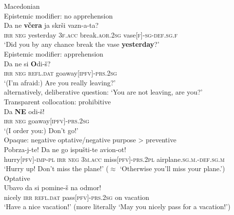 \documentclass[output=paper,colorlinks,citecolor=brown]{langscibook}
\begin{document}
\ea 
\textnormal{Macedonian} \\
\ea \label{ex:wiemer34} \textnormal{Epistemic modifier: no apprehension} \\
\gll Da ne \textbf{včera} ja skrši vazn-a-ta? \\
\textsc{irr} \textsc{neg} yesterday \textsc{3f.acc} break\textsc{.aor.2sg} vase[\textsc{f}]-\textsc{sg-def.sg.f} \\
\glt `Did you by any chance break the vase \textbf{yesterday}?' \\
\ex \label{ex:wiemer35} \textnormal{Epistemic modifier: apprehension}\\
\gll Da ne {\op}si{\cp} \textbf{O}di-š? \\
\textsc{irr} \textsc{neg} \textsc{refl.dat} go\textunderscore away\textsc{[ipfv]-prs.2sg} \\
\glt `(I'm afraid:) Are you really leaving?' \\
alternatively, deliberative question: `You are not leaving, are you?' \\
\ex \label{ex:wiemer36} \textnormal{Transparent collocation: prohibitive} \\
\gll Da \textbf{NE} odi-š! \\
\textsc{irr} \textsc{neg} go\textunderscore away\textsc{[ipfv]-prs.2sg} \\
\glt `(I order you:) Don't go!' \\
\ex \label{ex:wiemer37} \textnormal{Opaque: negative optative/negative purpose > preventive} \\
\gll Pobrza-j-te! Da ne go ispušti-te avion-ot! \\
hurry\textsc{[pfv]-imp-pl} \textsc{irr} \textsc{neg} \textsc{3m.acc} miss\textsc{[pfv]-prs.2pl} airplane\textsc{.sg.m.-def.sg.m} \\
\glt `Hurry up! Don't miss the plane!' ($\approx$ `Otherwise you'll miss your plane.') 
\newpage
\ex \label{ex:wiemer38} \textnormal{Optative} \\
\gll Ubavo da si pomine-š na odmor! \\
nicely \textsc{irr} \textsc{refl.dat} pass\textsc{[pfv]-prs.2sg} on vacation \\
\glt `Have a nice vacation!' (more literally `May you nicely pass for a vacation!')
\z
\z
\end{document}
